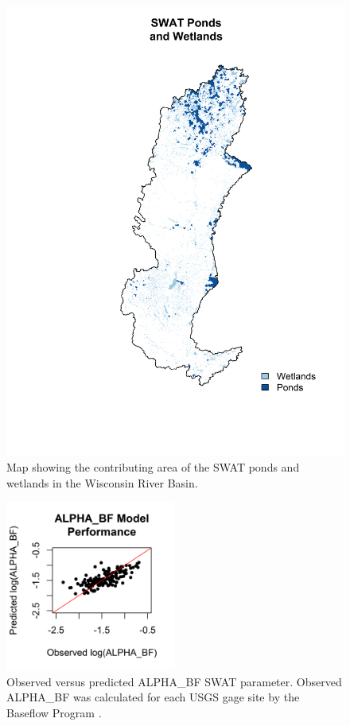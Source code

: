 \begin{figure}[h!]
	\centering
	\includegraphics[width=\textwidth]{./img/wetlands_and_ponds.png}
	\caption{Map showing the contributing area of the SWAT ponds and wetlands in the Wisconsin River Basin.}
	\label{fig:wetlands_and_ponds}
\end{figure}



\begin{figure}
	\centering
	\includegraphics[width=0.5\textwidth]{./img/alpha_bf_scatterplot.png}
	\caption{Observed versus predicted ALPHA\_BF SWAT parameter. Observed ALPHA\_BF was calculated for each USGS gage site  by the Baseflow Program \citep{arnold_automated_1995}.}
	\label{fig:alpha_bf_scatterplot}
\end{figure}

